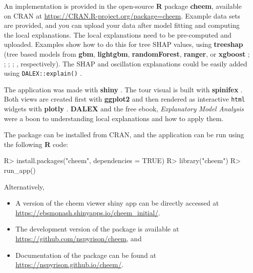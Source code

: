 \documentclass[
]{jss}
\providecommand{\tightlist}{%
  \setlength{\itemsep}{0pt}\setlength{\parskip}{0pt}}
\begin{document}
An implementation is provided in the open-source \textbf{R} package
\textbf{cheem}, available on CRAN at
\url{https://CRAN.R-project.org/package=cheem}. Example data sets are
provided, and you can upload your data after model fitting and computing
the local explanations. The local explanations need to be pre-computed
and uploaded. Examples show how to do this for tree SHAP values, using
\textbf{treeshap} (tree based models from \textbf{gbm},
\textbf{lightgbm}, \textbf{randomForest}, \textbf{ranger}, or
\textbf{xgboost} \citet{greenwell_gbm_2020}; \citet{shi_lightgbm_2022};
\citet{liaw_classification_2002}; \citet{wright_ranger_2017};
\citet{chen_xgboost_2021}, respectively). The SHAP and oscillation
explanations could be easily added using \texttt{DALEX::explain()}
\citep{biecek_dalex_2018, biecek_explanatory_2021}.

The application was made with \textbf{shiny} \citep{chang_shiny_2021}.
The tour visual is built with \textbf{spinifex}
\citep{spyrison_spinifex_2020}. Both views are created first with
\textbf{ggplot2} \citep{wickham_ggplot2_2016} and then rendered as
interactive \texttt{html} widgets with \textbf{plotly}
\citep{sievert_interactive_2020}. \textbf{DALEX}
\citep{biecek_dalex_2018} and the free ebook, \emph{Explanatory Model
Analysis} \citep{biecek_explanatory_2021} were a boon to understanding
local explanations and how to apply them.

The package can be installed from CRAN, and the application can be run
using the following \textbf{R} code:

\begin{CodeChunk}
\begin{CodeInput}
R> install.packages("cheem", dependencies = TRUE)
R> library("cheem")
R> run_app()
\end{CodeInput}
\end{CodeChunk}

Alternatively,

\begin{itemize}
\tightlist
\item
  A version of the cheem viewer shiny app can be directly accessed at
  \url{https://ebsmonash.shinyapps.io/cheem_initial/}.
\item
  The development version of the package is available at
  \url{https://github.com/nspyrison/cheem}, and
\item
  Documentation of the package can be found at
  \url{https://nspyrison.github.io/cheem/}.
\end{itemize}
\end{document}
